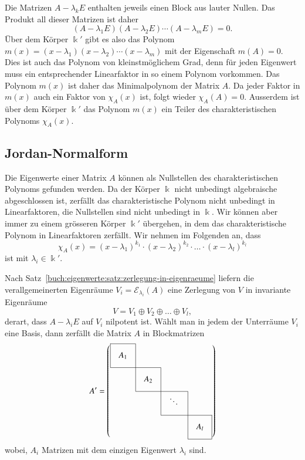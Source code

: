 Die Matrizen $A-\lambda_kE$ enthalten jeweils einen Block aus lauter
Nullen.
Das Produkt all dieser Matrizen  ist daher
\[
(A-\lambda_1E)
(A-\lambda_2E)
\cdots
(A-\lambda_mE)
=
0.
\]
Über dem Körper $\Bbbk'$ gibt es also das Polynom
$m(x)=(x-\lambda_1)(x-\lambda_2)\cdots(x-\lambda_m)$ mit der Eigenschaft
$m(A)=0$.
Dies ist auch das Polynom von kleinstmöglichem Grad, denn für jeden
Eigenwert muss ein entsprechender Linearfaktor in so einem Polynom vorkommen.
Das Polynom $m(x)$ ist daher das Minimalpolynom der Matrix $A$.
Da jeder Faktor in $m(x)$ auch ein Faktor von $\chi_A(x)$ ist,
folgt wieder $\chi_A(A)=0$.
Ausserdem ist über dem Körper $\Bbbk'$ das Polynom $m(x)$ ein Teiler
des charakteristischen Polynoms $\chi_A(x)$.

\subsection{Jordan-Normalform
\label{buch:subsection:jordan-normalform}}
Die Eigenwerte einer Matrix $A$ können als Nullstellen des 
charakteristischen Polynoms gefunden werden.
Da der Körper $\Bbbk$ nicht unbedingt algebraische abgeschlossen ist,
zerfällt das charakteristische Polynom nicht unbedingt in Linearfaktoren,
die Nullstellen sind nicht unbedingt in $\Bbbk$.
Wir können aber immer zu einem grösseren Körper $\Bbbk'$ übergehen,
in dem das charakteristische Polynom in Linearfaktoren zerfällt.
Wir nehmen im Folgenden an, dass 
\[
\chi_A(x)
=
(x-\lambda_1)^{k_1}
\cdot
(x-\lambda_2)^{k_2}
\cdot
\dots
\cdot
(x-\lambda_l)^{k_l}
\]
ist mit $\lambda_i\in\Bbbk'$.

Nach Satz~\ref{buch:eigenwerte:satz:zerlegung-in-eigenraeume} liefern
die verallgemeinerten Eigenräume $V_i=\mathcal{E}_{\lambda_i}(A)$ eine
Zerlegung von $V$ in invariante Eigenräume
\[
V=V_1\oplus V_2\oplus \dots\oplus V_l,
\]
derart, dass $A-\lambda_iE$ auf $V_i$ nilpotent ist.
Wählt man in jedem der Unterräume $V_i$ eine Basis, dann zerfällt die
Matrix $A$ in Blockmatrizen
\begin{equation}
\def\temp#1{\multicolumn{1}{|c}{\raisebox{0pt}[17pt][12pt]{\phantom{x}$#1\mathstrut$}\phantom{x}}}
A'
=\left(
\begin{array}{cccc}
\cline{1-1}
\temp{A_{1}} &\multicolumn{1}{|c}{}&        &           \\
\cline{1-2}
          &\temp{A_{2}}&\multicolumn{1}{|c}{}&           \\
\cline{2-3}
          &           &\temp{\ddots}&\multicolumn{1}{|c}{}\\
\cline{3-4}
          &           &        &\multicolumn{1}{|c|}{\raisebox{0pt}[17pt][12pt]{\phantom{x}$A_{l}$}\phantom{x}}\\
\cline{4-4}
\end{array}
\right)
\label{buch:eigenwerte:eqn:allgjordan}
\end{equation}
wobei, $A_i$ Matrizen mit dem einzigen Eigenwert $\lambda_i$ sind.

